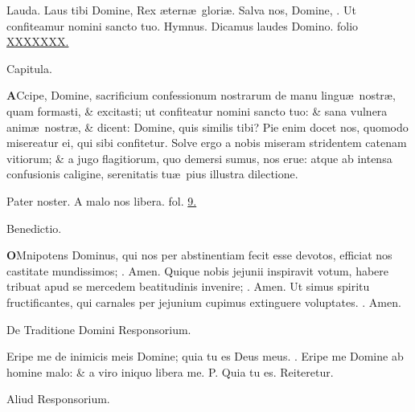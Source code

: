 \documentclass[letter,11pt]{book}
\makeatletter
\DeclareRobustCommand{\Vbar}{\vers@resp{-0.1em}{V}}
\DeclareRobustCommand{\Rbar}{\vers@resp{0pt}{R}}
\newcommand{\vers@resp@sym}{\raisebox{0.2ex}{\rotatebox[origin=c]{-20}{$\m@th\rceil$}}}
\newcommand{\vers@resp}[2]{%
  {\ooalign{\hidewidth\kern#1\vers@resp@sym\hidewidth\cr#2\cr}}%
}%
\def\P{\color{Red} P. \color{black}}
\def\V{\color{Red} \Vbar . \color{black}}
\def\R{\color{Red} \Rbar . \color{black}}
\makeatother
\begin{document}
\begin{multicols*}{2}
\newline \color{Red} Lauda. \color{black} Laus tibi Domine, Rex \ae tern\ae \ glori\ae . Salva nos, Domine, \V Ut confiteamur nomini sancto tuo.
\newline \color{Red} Hymnus. \color{black} Dicamus laudes Domino. \color{Red} folio \color{black} \hyperlink{}{XXXXXXX.}
\vspace{-.5em} \begin{center} \color{Red} Capitula. \end{center} \vspace{-.5em}
\lettrine[lines=2]{\bfseries \color{Red} A}{}Ccipe, Domine, sacrificium confessionum nostrarum de manu lingu\ae \ nostr\ae , quam formasti, \& excitasti; ut confiteatur nomini sancto tuo: \& sana vulnera anim\ae \ nostr\ae , \& dicent: Domine, quis similis tibi? Pie enim docet nos, quomodo misereatur ei, qui sibi confitetur. Solve ergo a nobis miseram stridentem catenam vitiorum; \& a jugo flagitiorum, quo demersi sumus, nos erue: atque ab intensa confusionis caligine, serenitatis tu\ae \ pius illustra dilectione.
\par Pater noster.
\newline A malo nos libera. \color{Red} fol. \color{black} \hyperlink{page.9}{9.}
\vspace{-.5em} \begin{center} \color{Red} Benedictio. \end{center} \vspace{-.5em}
\lettrine[lines=2]{\bfseries \color{Red} O}{}Mnipotens Dominus, qui nos per abstinentiam fecit esse devotos, efficiat nos castitate mundissimos; \R Amen. Quique nobis jejunii inspiravit votum, habere tribuat apud se mercedem beatitudinis invenire; \R Amen. Ut simus spiritu fructificantes,
qui carnales per jejunium cupimus extinguere voluptates. \R Amen.
\vspace{-.5em} \begin{center} \color{Red} De Traditione Domini Responsorium. \end{center} \vspace{-.5em}
\par \noindent Eripe me de inimicis meis Domine; quia tu es Deus meus. \V Eripe me Domine ab homine malo: \& a viro iniquo libera me. \P Quia tu es. \color{Red} Reiteretur. \color{black}
\vspace{-.5em} \begin{center} \color{Red} Aliud Responsorium. \end{center} \vspace{-.5em}

\end{multicols*}
\end{document}
